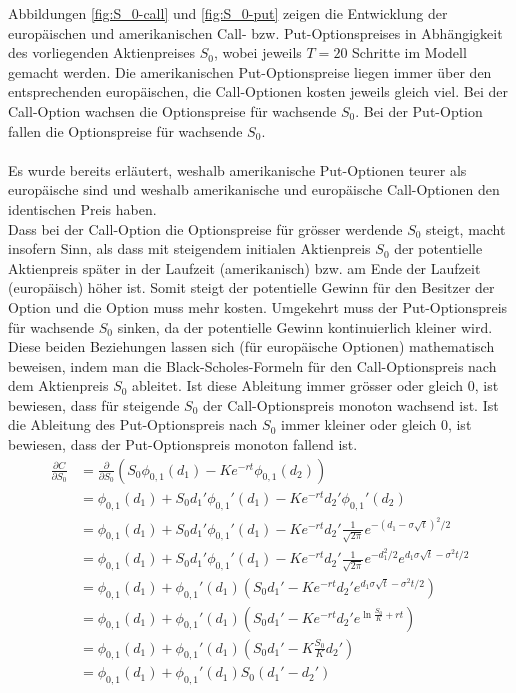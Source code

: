 \documentclass[11pt]{report} %
\newcommand\pd[2]{\displaystyle\frac{\partial #1}{\partial #2}}
\begin{document}
Abbildungen \ref{fig:S_0-call} und \ref{fig:S_0-put} zeigen die Entwicklung der europäischen und amerikanischen Call- bzw. Put-Optionspreises in Abhängigkeit des vorliegenden Aktienpreises $S_0$, wobei jeweils $T=20$ Schritte im Modell gemacht werden. Die amerikanischen Put-Optionspreise liegen immer über den entsprechenden europäischen, die Call-Optionen kosten jeweils gleich viel. Bei der Call-Option wachsen die Optionspreise für wachsende $S_0$. Bei der Put-Option fallen die Optionspreise für wachsende $S_0$.\\\\
Es wurde bereits erläutert, weshalb amerikanische Put-Optionen teurer als europäische sind und weshalb amerikanische und europäische Call-Optionen den identischen Preis haben.\\Dass bei der Call-Option die Optionspreise für grösser werdende $S_0$ steigt, macht insofern Sinn, als dass mit steigendem initialen Aktienpreis $S_0$ der potentielle Aktienpreis später in der Laufzeit (amerikanisch) bzw. am Ende der Laufzeit (europäisch) höher ist. Somit steigt der potentielle Gewinn für den Besitzer der Option und die Option muss mehr kosten. Umgekehrt muss der Put-Optionspreis für wachsende $S_0$ sinken, da der potentielle Gewinn kontinuierlich kleiner wird. Diese beiden Beziehungen lassen sich (für europäische Optionen) mathematisch beweisen, indem man die Black-Scholes-Formeln für den Call-Optionspreis nach dem Aktienpreis $S_0$ ableitet. Ist diese Ableitung immer grösser oder gleich 0, ist bewiesen, dass für steigende $S_0$ der Call-Optionspreis monoton wachsend ist. Ist die Ableitung des Put-Optionspreis nach $S_0$ immer kleiner oder gleich 0, ist bewiesen, dass der Put-Optionspreis monoton fallend ist.
    \begin{align*}
    \pd{C}{S_0}&=\frac{\partial}{\partial S_0}\left(S_0\phi_{0, 1}(d_1)-Ke^{-rt}\phi_{0, 1}(d_2)\right)\\
    &=\phi_{0, 1}(d_1)+S_0d_1'\phi_{0,1}'(d_1)-Ke^{-rt}d_2'\phi_{0,1}'(d_2)\\
    &=\phi_{0, 1}(d_1)+S_0d_1'\phi_{0,1}'(d_1)-Ke^{-rt}d_2'\frac{1}{\sqrt{2\pi}}e^{-(d_1-\sigma\sqrt{t})^2/2}\\
    &=\phi_{0, 1}(d_1)+S_0d_1'\phi_{0,1}'(d_1)-Ke^{-rt}d_2'\frac{1}{\sqrt{2\pi}}e^{-d_1^2/2}e^{d_1\sigma\sqrt{t}-\sigma^2t/2}\\
    &=\phi_{0, 1}(d_1)+\phi_{0, 1}'(d_1)\left(S_0d_1'-Ke^{-rt}d_2'e^{d_1\sigma\sqrt{t}-\sigma^2t/2}\right)\\
    &=\phi_{0, 1}(d_1)+\phi_{0, 1}'(d_1)\left(S_0d_1'-Ke^{-rt}d_2'e^{\ln{\frac{S_0}{K}}+rt}\right)\\
    &=\phi_{0, 1}(d_1)+\phi_{0, 1}'(d_1)\left(S_0d_1'-K\frac{S_0}{K}d_2'\right)\\
    &=\phi_{0, 1}(d_1)+\phi_{0, 1}'(d_1)S_0\left(d_1'-d_2'\right)
\end{align*}
\end{document}
